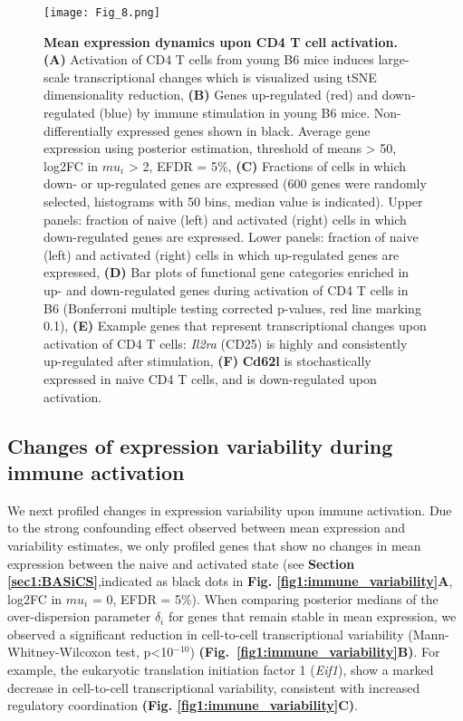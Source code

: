 \begin{figure}[!ht]
\centering
\texttt{[image: Fig\_8.png]}
\caption[Mean expression dynamics upon CD4\plus{} T cell activation]{\textbf{Mean expression dynamics upon CD4\plus{} T cell activation.}\\
\textbf{(A)} Activation of CD4\plus{} T cells from young B6 mice induces large-scale transcriptional changes which is visualized using tSNE dimensionality reduction, \textbf{(B)} Genes up-regulated (red) and down-regulated (blue) by immune stimulation in young B6 mice. Non-differentially expressed genes shown in black. Average gene expression using posterior estimation, threshold of means > 50, log2FC in $mu_i$ > 2, EFDR = 5\%, \textbf{(C)} Fractions of cells in which down- or up-regulated genes are expressed (600 genes were randomly selected, histograms with 50 bins, median value is indicated). Upper panels: fraction of naive (left) and activated (right) cells in which down-regulated genes are expressed. Lower panels: fraction of naive (left) and activated (right) cells in which up-regulated genes are expressed, \textbf{(D)} Bar plots of functional gene categories enriched in up- and down-regulated genes during activation of CD4\plus{} T cells in B6 (Bonferroni multiple testing corrected p-values, red line marking 0.1), \textbf{(E)} Example genes that represent transcriptional changes upon activation of CD4\plus{} T cells: \textit{Il2ra} (CD25) is highly and consistently up-regulated after stimulation, \textbf{(F)} \textbf{Cd62l} is stochastically expressed in naive CD4\plus{} T cells, and is down-regulated upon activation.
}
\label{fig1:immune_activation}
\end{figure}

\newpage

\subsection{Changes of expression variability during immune activation}

We next profiled changes in expression variability upon immune activation. Due to the strong confounding effect observed between mean expression and variability estimates, we only profiled genes that show no changes in mean expression between the naive and activated state (see \textbf{Section \ref{sec1:BASiCS}},indicated as black dots in \textbf{Fig. \ref{fig1:immune_variability}A}, log2FC in $mu_i$ = 0, EFDR = 5\%). When comparing posterior medians of the over-dispersion parameter $\delta_i$ for genes that remain stable in mean expression, we observed a significant reduction in cell-to-cell transcriptional variability (Mann-Whitney-Wilcoxon test, p<10$^{-10}$) \textbf{(Fig.~\ref{fig1:immune_variability}B)}. For example, the eukaryotic translation initiation factor 1 (\textit{Eif1}), show a marked decrease in cell-to-cell transcriptional variability, consistent with increased regulatory coordination \textbf{(Fig. \ref{fig1:immune_variability}C)}.\\

